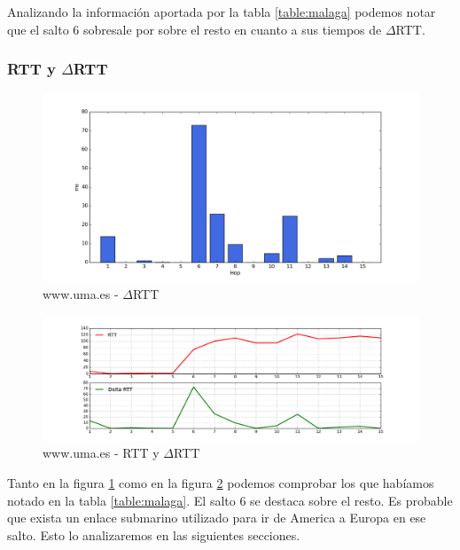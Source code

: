 Analizando la información aportada por la tabla \ref{table:malaga} podemos notar que el salto 6 sobresale por sobre el resto en cuanto a sus tiempos de $\Delta$RTT. 

\subsubsection{RTT y $\Delta$RTT}

\begin{figure}[H]
    \begin{center}
        \includegraphics[width=1\textwidth]{data/rtt-malaga-bar.png}
        \caption{www.uma.es - $\Delta$RTT}
        \label{histo:malaga}
    \end{center}
\end{figure}

\begin{figure}[H]
    \begin{center}
        \includegraphics[width=1\textwidth]{data/rtt-malaga-lines.png}
        \caption{www.uma.es - RTT y $\Delta$RTT}
        \label{lines:malaga}
    \end{center}
\end{figure}

Tanto en la figura \ref{histo:malaga} como en la figura \ref{lines:malaga} podemos comprobar los que habíamos notado en la tabla \ref{table:malaga}. El salto 6 se destaca sobre el resto. Es probable que exista un enlace submarino utilizado para ir de America a Europa en ese salto. Esto lo analizaremos en las siguientes secciones.

